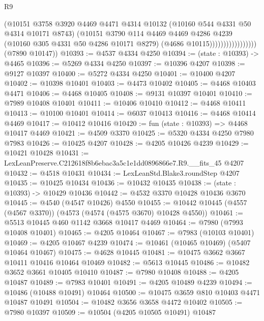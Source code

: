 \begin{lexlean}{R9}
\begin{coremodule}
                                  (@10151
                                    @3758
                                    @3920
                                    @4469
                                    @4471
                                    @4314
                                    @10132
                                    (@10160 @544 @4331 @50 @4314 @10171 @8743)
                                    (@10151
                                      @3790
                                      @114
                                      @4469
                                      @4469
                                      @4286
                                      @4239
                                      (@10160 @305 @4331 @50 @4286 @10171 @8279)
                                      (@4686 @10115)))))))))))))))))
      (@7890 @10147))
@10393 := @4537 @4334 @4250
@10394 := (state : @10393) -> @4465
@10396 := @5269 @4334 @4250
@10397 := @10396 @4207
@10398 := @9127 @10397
@10400 := @5272 @4334 @4250
@10401 := @10400 @4207
@10402 := @10398 @10401
@10403 := @4473 @10402
@10405 := @4468 @10403 @4471
@10406 := @4468 @10405
@10408 := @9131 @10397 @10401
@10410 := @7989 @10408 @10401
@10411 := @10406 @10410
@10412 := @4468 @10411
@10413 := @10100 @10401
@10414 := @6037 @10413
@10416 := @4468 @10414 @4469
@10417 := @10412 @10416
@10420 := fun (state : @10393) => @4468 @10417 @4469
@10421 := @4509 @3370
@10425 := @5320 @4334 @4250 @7980 @7983
@10426 := @10425 @4207
@10428 := @4205 @10426 @4239
@10429 := @10421 @10428
@10431 := LexLeanPreserve.C212618f8b6ebac3a5c1e1dd0896866e7.R9.__fits_45 @4207
@10432 := @4518 @10431
@10434 := LexLeanStd.Blake3.roundStep @4207
@10435 := @10425 @10434
@10436 := @10432 @10435
@10438 := (state : @10393) -> @10429 @10436
@10442 := @4532 @3370 @10428 @10436 @3670
@10445 := @4540 (@4547 @10426) @4550
@10455 := @10442 @10445 (@4557 (@4567 @3370)) (@4573 (@4574 (@4575 @3670) @10428 @4550))
@10461 := @5513 @10445 @460 @1142 @3668 @10417 @4469
@10464 := @7980 (@7993 @10408 @10401)
@10465 := @4205 @10464
@10467 := @7983 (@10103 @10401)
@10469 := @4205 @10467 @4239
@10474 := @10461 (@10465 @10469) (@5407 @10464 @10467)
@10475 := @4628 @10445
@10481 := @10475 @3662 @3667 @10411 @10416 @10464 @10469
@10482 := @5613 @10445
@10486 := @10482 @3652 @3661 @10405 @10410
@10487 := @7980 @10408
@10488 := @4205 @10487
@10489 := @7983 @10401
@10491 := @4205 @10489 @4239
@10494 := @10486 (@10488 @10491) @10464
@10500 := @10475 @3659 @810 @10403 @4471 @10487 @10491
@10504 := @10482 @3656 @3658 @4472 @10402
@10505 := @7980 @10397
@10509 := @10504 (@4205 @10505 @10491) @10487

\end{coremodule}
\end{lexlean}
